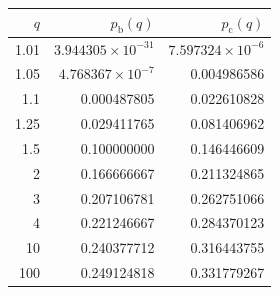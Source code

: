 \begin{tabular}{@{}rrr@{}}
\toprule
$q$ & $p_{\mathrm{b}}(q)$ & $p_{\mathrm{c}}(q)$ \\
\midrule
1.01 & $3.944305\times10^{-31}$ & $7.597324\times10^{-6}$ \\
1.05 & $4.768367\times10^{-7}$ & 0.004986586 \\
1.1 & 0.000487805 & 0.022610828 \\
1.25 & 0.029411765 & 0.081406962 \\
1.5 & 0.100000000 & 0.146446609 \\
2 & 0.166666667 & 0.211324865 \\
3 & 0.207106781 & 0.262751066 \\
4 & 0.221246667 & 0.284370123 \\
10 & 0.240377712 & 0.316443755 \\
100 & 0.249124818 & 0.331779267 \\
\bottomrule
\end{tabular}
